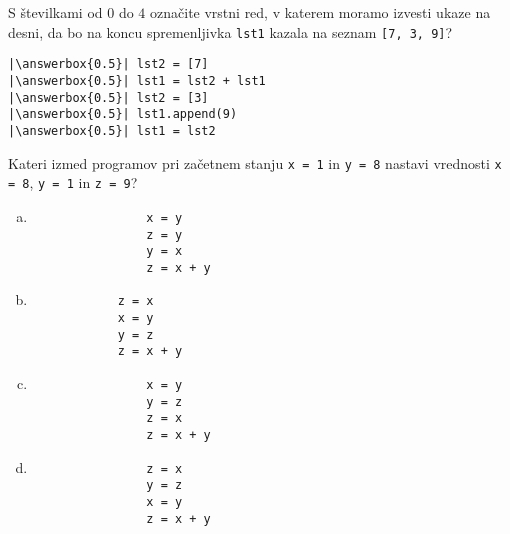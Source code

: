 \documentclass[arhiv, 10pt]{../izpit}
\newcommand{\inlinepy}[1]{\texttt{#1}}
\newcommand{\answerbox}[1]{\framebox{\vphantom{\large M}\hspace{#1cm}}}
\begin{document}
        \naloga*
        \begin{multicols}{2}
        \noindent 
        S številkami od $0$ do $4$ označite vrstni red, v katerem moramo izvesti ukaze na desni, da bo na koncu spremenljivka \inlinepy{lst1} kazala na seznam \inlinepy{[7, 3, 9]}?
    
        \columnbreak
        \noindent
        \begin{verbatim}
|\answerbox{0.5}| lst2 = [7]
|\answerbox{0.5}| lst1 = lst2 + lst1
|\answerbox{0.5}| lst2 = [3]
|\answerbox{0.5}| lst1.append(9)
|\answerbox{0.5}| lst1 = lst2

        \end{verbatim}
        \end{multicols}
    
            
        \naloga*
        
        Kateri izmed programov pri začetnem stanju
            \inlinepy{x = 1} in
            \inlinepy{y = 8}
        nastavi vrednosti
            \inlinepy{x = 8},
            \inlinepy{y = 1} in
            \inlinepy{z = 9}?
    
        \begin{multicols}{4}
        \begin{enumerate}[(a)]
\item 
                \begin{verbatim}
                x = y
                z = y
                y = x
                z = x + y
                \end{verbatim}
            
\item 
            \begin{verbatim}
            z = x
            x = y
            y = z
            z = x + y
            \end{verbatim}
        
\item 
                \begin{verbatim}
                x = y
                y = z
                z = x
                z = x + y
                \end{verbatim}
            
\item 
                \begin{verbatim}
                z = x
                y = z
                x = y
                z = x + y
                \end{verbatim}
            
\end{enumerate}

        \end{multicols}
    
\end{document}
